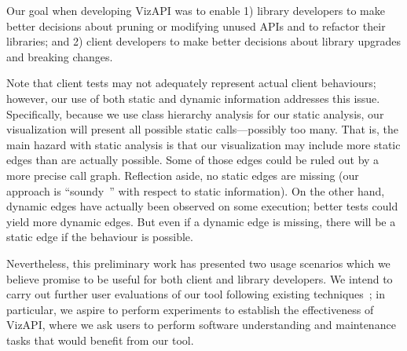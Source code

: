 \label{sec:discussion}
Our goal when developing VizAPI was to enable 1) library developers to make better
decisions about pruning or modifying unused APIs and to refactor their
libraries; and 2) client developers to make better decisions about library
upgrades and breaking changes.


Note that client tests may
not adequately represent actual client behaviours; however, our use of both static
and dynamic information addresses this issue. Specifically, because we use
class hierarchy analysis for our static analysis, our visualization will present
all possible static calls---possibly too many. 
That is, the main hazard with static analysis is that our visualization may include more
static edges than are actually possible. Some of those edges could be ruled out by a more
precise call graph. Reflection aside, no static edges
are missing (our approach is ``soundy~\cite{livshits15:_in_defen_sound}'' with respect to static information). On the other hand, dynamic edges have actually been observed
on some execution; better tests could yield more dynamic edges. But even if
a dynamic edge is missing, there will be a static edge if the behaviour is possible.

Nevertheless, this preliminary work has presented two usage scenarios which we
believe promise to be useful for both client and library
developers. We intend to carry out further user evaluations of our tool following
existing techniques~\cite{merino18:_system_liter_review_softw_visual_evaluat}; in
particular, we aspire to perform experiments to establish the
effectiveness of VizAPI, where we ask users to perform software
understanding and maintenance tasks that would benefit from our tool.



